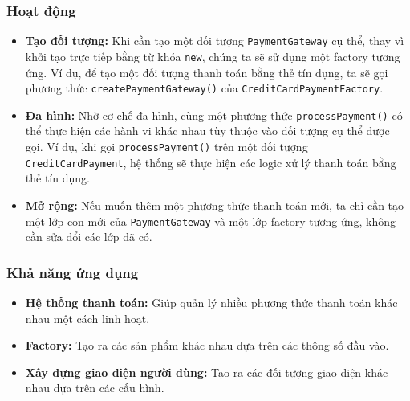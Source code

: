 \subsubsection{Hoạt động}
\begin{flushleft}
    \begin{itemize}
        \item \textbf{Tạo đối tượng:} Khi cần tạo một đối tượng \verb|PaymentGateway| cụ thể, thay vì khởi tạo trực tiếp bằng từ khóa \verb|new|, chúng ta sẽ sử dụng một factory tương ứng. Ví dụ, để tạo một đối tượng thanh toán bằng thẻ tín dụng, ta sẽ gọi phương thức \verb|createPaymentGateway()| của \verb|CreditCardPaymentFactory|.
        \item \textbf{Đa hình:} Nhờ cơ chế đa hình, cùng một phương thức \verb|processPayment()| có thể thực hiện các hành vi khác nhau tùy thuộc vào đối tượng cụ thể được gọi. Ví dụ, khi gọi \verb|processPayment()| trên một đối tượng \verb|CreditCardPayment|, hệ thống sẽ thực hiện các logic xử lý thanh toán bằng thẻ tín dụng.
        \item \textbf{Mở rộng:} Nếu muốn thêm một phương thức thanh toán mới, ta chỉ cần tạo một lớp con mới của \verb|PaymentGateway| và một lớp factory tương ứng, không cần sửa đổi các lớp đã có.
    \end{itemize}
\end{flushleft}

\subsubsection{Khả năng ứng dụng}
\begin{flushleft}
    \begin{itemize}
        \item \textbf{Hệ thống thanh toán:} Giúp quản lý nhiều phương thức thanh toán khác nhau một cách linh hoạt.
        \item \textbf{Factory:} Tạo ra các sản phẩm khác nhau dựa trên các thông số đầu vào.
        \item \textbf{Xây dựng giao diện người dùng:} Tạo ra các đối tượng giao diện khác nhau dựa trên các cấu hình.
    \end{itemize}
\end{flushleft}

